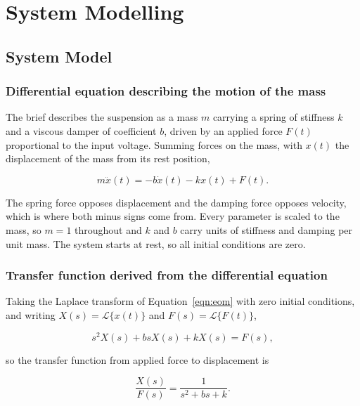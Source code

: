 \section{System Modelling}\label{sec:modelling}

\subsection{System Model}

\subsubsection{Differential equation describing the motion of the mass}

The brief describes the suspension as a mass $m$ carrying a spring of stiffness $k$ and a
viscous damper of coefficient $b$, driven by an applied force $F(t)$ proportional to the
input voltage. Summing forces on the mass, with $x(t)$ the displacement of the mass from
its rest position,

\begin{equation}\label{eqn:eom}
    m\ddot{x}(t) = -b\dot{x}(t) - kx(t) + F(t).
\end{equation}

The spring force opposes displacement and the damping force opposes velocity, which is
where both minus signs come from. Every parameter is scaled to the mass, so $m = 1$
throughout and $k$ and $b$ carry units of stiffness and damping per unit mass. The system
starts at rest, so all initial conditions are zero.

\subsubsection{Transfer function derived from the differential equation}

Taking the Laplace transform of Equation~\ref{eqn:eom} with zero initial conditions, and
writing $X(s) = \mathcal{L}\{x(t)\}$ and $F(s) = \mathcal{L}\{F(t)\}$,

\begin{equation}
    s^2X(s) + bsX(s) + kX(s) = F(s),
\end{equation}

so the transfer function from applied force to displacement is

\begin{equation}\label{eqn:tf}
    \frac{X(s)}{F(s)} = \frac{1}{s^2 + bs + k}.
\end{equation}

